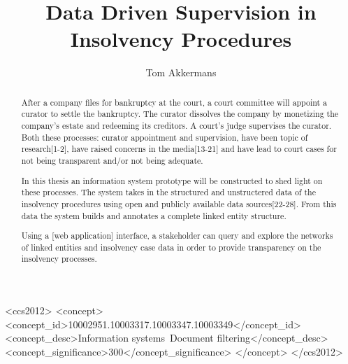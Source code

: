 \documentclass[sigconf]{acmart}
\begin{document}

\pagebreak
\title{Data Driven Supervision in Insolvency Procedures}

\author{Tom Akkermans}


\begin{abstract}
After a company files for bankruptcy at the court, a court committee will appoint a curator to settle the bankruptcy. The curator dissolves the company by monetizing the company's estate and redeeming its creditors. A court’s judge supervises the curator. Both these processes: curator appointment and supervision, have been topic of research[1-2], have raised concerns in the media[13-21] and have lead to court cases for not being transparent and/or not being adequate.

In this thesis an information system prototype will be constructed to shed light on these processes. The system takes in the structured and unstructered data of the insolvency procedures using open and publicly available data sources[22-28]. From this data the system builds and annotates a complete linked entity structure.

Using a [web application] interface, a stakeholder can query and explore the networks of linked entities and insolvency case data in order to provide transparency on the insolvency processes.
\end{abstract}

%
%
\begin{CCSXML}
<ccs2012>
	<concept>
		<concept_id>10002951.10003317.10003347.10003349</concept_id>
		<concept_desc>Information systems~Document filtering</concept_desc>
		<concept_significance>300</concept_significance>
	</concept>
</ccs2012>
\end{CCSXML}




\maketitle





\end{document}
